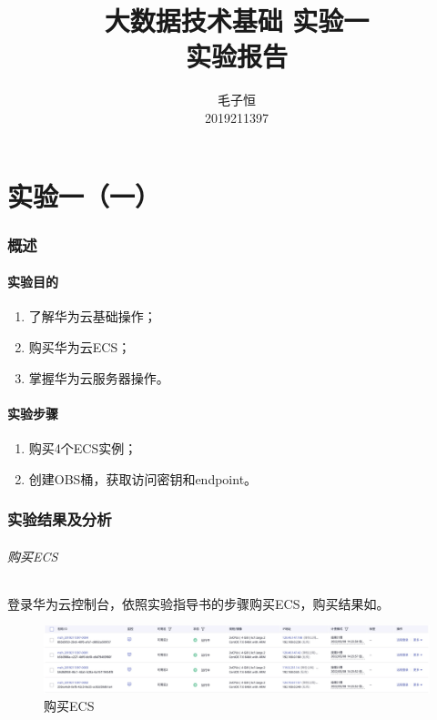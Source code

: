 \documentclass[lang=cn,11pt,a4paper,cite=authornum]{paper}
\title{大数据技术基础 实验一 \\ 实验报告}
\author{毛子恒 \\ 2019211397}
\institute{北京邮电大学\ 计算机学院}
\date{\zhtoday}
\begin{document}
\maketitle

\part{实验一（一）}

\section{概述}

\subsection{实验目的}

\begin{enumerate}
    \item 了解华为云基础操作；
    \item 购买华为云ECS；
    \item 掌握华为云服务器操作。
\end{enumerate}

\subsection{实验步骤}

\begin{enumerate}
    \item 购买4个ECS实例；
    \item 创建OBS桶，获取访问密钥和endpoint。
\end{enumerate}

\section{实验结果及分析}

\paragraph{购买ECS}

登录华为云控制台，依照实验指导书的步骤购买ECS，购买结果如。

\begin{figure}[!htb]
    \centering
    \includegraphics[width=\textwidth]{./images/ECS.jpg}
    \caption{购买ECS\label{fig:ECS}}
\end{figure}
\end{document}
